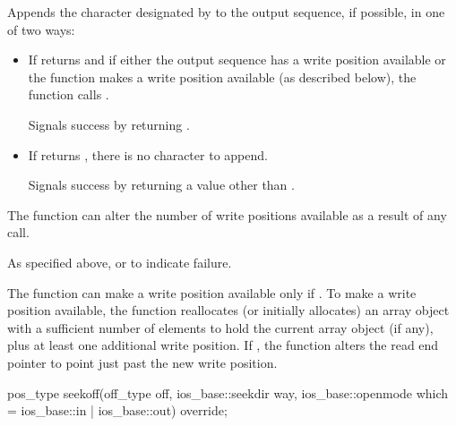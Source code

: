 \begin{itemdescr}
\pnum
\effects
Appends the character designated by  to the output
sequence, if possible, in one of two ways:
\begin{itemize}
\item
If
returns
and if either
the output sequence has a write position available or
the function makes a write position available
(as described below),
the function calls
.

Signals success by returning .

\item
If
returns
,
there is no character to append.

Signals success by returning a value other than
.
\end{itemize}

\pnum
\remarks
The function can alter the number of write positions available as a
result of any call.

\pnum
\returns
As specified above, or
to indicate failure.

\pnum
The function can make a write position available only if
.
To make a write position available,
the function reallocates (or initially allocates) an array object
with a sufficient number of elements to hold
the current array object (if any), plus
at least
one additional write position.
If
,
the function alters the read end pointer
to point just past the new write position.
\end{itemdescr}

%
\begin{itemdecl}
pos_type seekoff(off_type off, ios_base::seekdir way,
                 ios_base::openmode which
                   = ios_base::in | ios_base::out) override;
\end{itemdecl}

